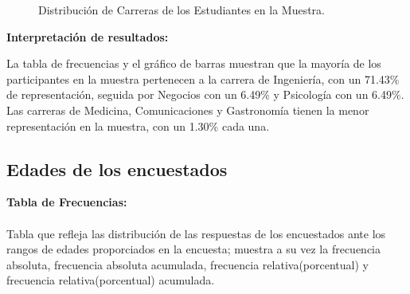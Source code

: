 \documentclass{article}
\begin{document}
\begin{figure}[H]
  \centering
  \caption{Distribución de Carreras de los Estudiantes en la Muestra.}
  \label{fig:carreras-frecuencias}
\end{figure}

\textbf{Interpretación de resultados:}

La tabla de frecuencias y el gráfico de barras muestran que la mayoría de los participantes en la muestra pertenecen a la carrera de Ingeniería, con un 71.43\% de representación, seguida por Negocios con un 6.49\% y Psicología con un 6.49\%. Las carreras de Medicina, Comunicaciones y Gastronomía tienen la menor representación en la muestra, con un 1.30\% cada una.

\newpage

\subsection{Edades de los encuestados}
	\noindent \textbf{Tabla de Frecuencias:} \\ \\
	Tabla que refleja las distribución de las respuestas de los encuestados ante los rangos de edades proporciados en la encuesta; muestra a su vez la frecuencia absoluta, frecuencia absoluta acumulada, frecuencia relativa(porcentual) y frecuencia relativa(porcentual) acumulada.
	
\end{document}
